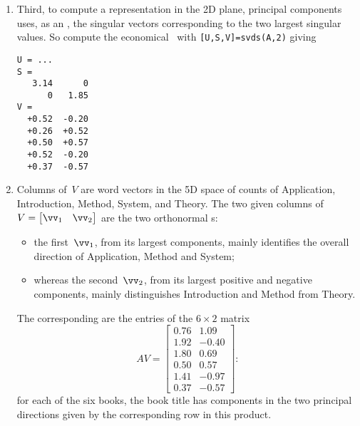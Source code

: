 \begin{enumerate}
\item Third, to compute a representation in the 2D plane, principal components uses, as an , the singular vectors corresponding to the two largest singular values.  
So compute the economical \svd\ with \verb|[U,S,V]=svds(A,2)| giving \twodp
\begin{verbatim}
U = ...
S =
   3.14      0
      0   1.85
V =
  +0.52  -0.20
  +0.26  +0.52
  +0.50  +0.57
  +0.52  -0.20
  +0.37  -0.57
\end{verbatim}

\item Columns of~\(V\) are word vectors in the 5D space of counts of Application, Introduction, Method, System, and Theory.
The two given columns of \(V=\begin{bmatrix} \vv_1&\vv_2 \end{bmatrix}\) are the two orthonormal s:
\begin{itemize}
\item the first~\(\vv_1\), from its largest components, mainly identifies the overall direction of Application, Method and System;
\item whereas the second~\(\vv_2\), from its largest positive and negative components, mainly distinguishes Introduction and Method from Theory.
\end{itemize}
The corresponding  are the entries of the \(6\times 2\) matrix
\begin{equation*}
AV=\begin{bmatrix} 0.76 & 1.09 \\
1.92 & -0.40 \\
1.80 & 0.69 \\
0.50 & 0.57 \\
1.41 & -0.97 \\
0.37 & -0.57 \end{bmatrix}:
\end{equation*}
for each of the six books, the book title has components in the two principal directions given by the corresponding row in this product.
\end{enumerate}
